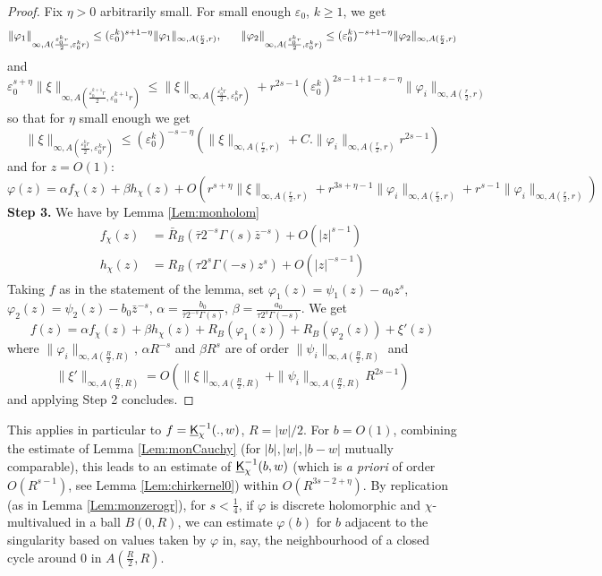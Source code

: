 \documentclass[10pt]{article}
\newcommand{\eps}{\varepsilon}
\newcommand{\uK}{{\underline {\sf K}}}
\begin{document}
\begin{proof}
Fix $\eta>0$ arbitrarily small. For small enough $\eps_0$, $k\geq 1$, we get
$$\|\varphi_1\|_{\infty,A(\frac{\eps_0^kr}2,\eps_0^kr)}\leq (\eps_0^k)^{s+1-\eta}\|\varphi_1\|_{\infty,A(\frac{r}2,r)},{\rm\ \ \ \ \ }
\|\varphi_2\|_{\infty,A(\frac{\eps_0^kr}2,\eps_0^kr)}\leq (\eps_0^k)^{-s+1-\eta}\|\varphi_2\|_{\infty,A(\frac{r}2,r)}
$$
and
$$\eps_0^{s+\eta}\|\xi\|_{\infty,A(\frac{\eps^{k+1}_0r}2,\eps^{k+1}_0r)}\leq \|\xi\|_{\infty,A(\frac{\eps_0^kr}2,\eps_0^kr)}+r^{2s-1}(\eps_0^k)^{2s-1+1-s-\eta}\|\varphi_i\|_{\infty,A(\frac r2,r)}$$
so that for $\eta$ small enough we get
$$\|\xi\|_{\infty,A(\frac{\eps_0^kr}2,\eps_0^kr)}\leq (\eps_0^k)^{-s-\eta}\left(\|\xi\|_{\infty,A(\frac{r}2,r)}+C.\|\varphi_i\|_{\infty,A(\frac r2,r)}r^{2s-1}\right)$$
and for $z=O(1)$:
$$\varphi(z)=\alpha f_\chi(z)+\beta h_\chi(z)+
O(r^{s+\eta}\|\xi\|_{\infty,A(\frac r2,r)}+r^{3s+\eta-1}\|\varphi_i\|_{\infty,A(\frac r2,r)}+r^{s-1}\|\varphi_i\|_{\infty,A(\frac r2,r)})
$$
{\bf Step 3.} We have by Lemma \ref{Lem:monholom}
\begin{align*}
f_\chi(z)&=\bar R_B(\bar\tau 2^{-s}\Gamma(s)\bar z^{-s})+O(|z|^{s-1})\\
h_\chi(z)&=R_B(\tau 2^{s}\Gamma(-s)z^s)+O(|z|^{-s-1})
\end{align*}
Taking $f$ as in the statement of the lemma, set $\varphi_1(z)=\psi_1(z)-a_0z^s$, $\varphi_2(z)=\psi_2(z)-b_0\bar z^{-s}$, $\alpha=\frac{b_0}{\bar\tau 2^{-s}\Gamma(s)}$, $\beta=\frac{a_0}{\tau 2^s\Gamma(-s)}$. We get
$$f(z)=\alpha f_\chi(z)+\beta h_\chi(z)+R_B(\varphi_1(z))+R_B(\varphi_2(z))+\xi'(z)$$
where $\|\varphi_i\|_{\infty,A(\frac R2,R)}$, $\alpha R^{-s}$ and $\beta R^s$ are of order $\|\psi_i\|_{\infty,A(\frac R2,R)}$ and
$$\|\xi'\|_{\infty,A(\frac R2,R)}=O(\|\xi\|_{\infty,A(\frac R2,R)}+\|\psi_i\|_{\infty,A(\frac R2,R)}R^{2s-1})
$$
and applying Step 2 concludes.
\end{proof}

This applies in particular to $f=\uK_\chi^{-1}(.,w)$, $R=|w|/2$. For  $b=O(1)$, combining the estimate of Lemma \ref{Lem:monCauchy} (for $|b|,|w|,|b-w|$ mutually comparable), this leads to an estimate of $\uK_\chi^{-1}(b,w)$ (which is {\em a priori} of order $O(R^{s-1})$, see Lemma \ref{Lem:chirkernel0}) within $O(R^{3s-2+\eta})$. By replication (as in Lemma \ref{Lem:monzerogr}), for $s<\frac 14$, if $\varphi$ is discrete holomorphic and $\chi$-multivalued in a ball $B(0,R)$, we can estimate $\varphi(b)$ for $b$ adjacent to the singularity based on values taken by $\varphi$ in, say, the neighbourhood of a closed cycle around 0 in $A(\frac R2,R)$.
\end{document}
